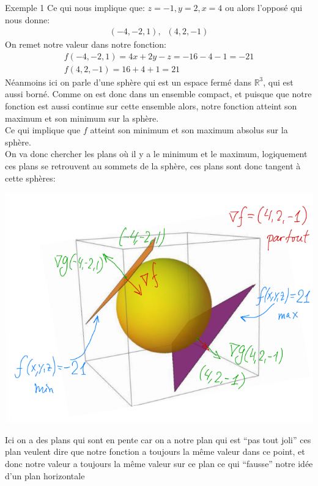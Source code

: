 \begin{parag}{Exemple 1}
    Ce qui nous implique que: $z =  -1, y = 2, x = 4$ ou alors l'opposé qui nous donne:
    \begin{align*} \left(-4, -2, 1\right), \; \; \left(4, 2, -1\right) \end{align*}
    On remet notre valeur dans notre fonction:
    \begin{align*} f\left(-4, -2, 1\right) =  4x + 2y - z =  -16 -4 -1 =  -21\\
                    f\left(4, 2, -1\right) =  16 + 4 + 1 =  21
    \end{align*}
    Néanmoins ici on parle d'une sphère qui est un espace fermé dans $\mathbb{R}^{3}$, qui est aussi borné. Comme on est donc dans un ensemble compact, et puisque que notre fonction est aussi continue sur cette ensemble alors, notre fonction atteint  son maximum et son minimum sur la sphère.\\
    Ce qui implique que $f$ atteint son minimum et son maximum absolus sur la sphère.\\
    On va donc chercher les plans où il y a le minimum et le maximum, logiquement ces plans se retrouvent au sommets de la sphère, ces plans sont donc tangent à cette sphères:
    \begin{center}
        \includegraphics[scale=0.5]{12025-05-07.png}
    \end{center}
    Ici on a des plans qui sont en pente car on a notre plan  qui est ``pas tout joli'' ces plan veulent dire que notre fonction a toujours la même valeur dans ce point, et donc notre valeur a toujours la même valeur sur ce plan ce qui ``fausse'' notre idée d'un plan horizontale
    
\end{parag}
